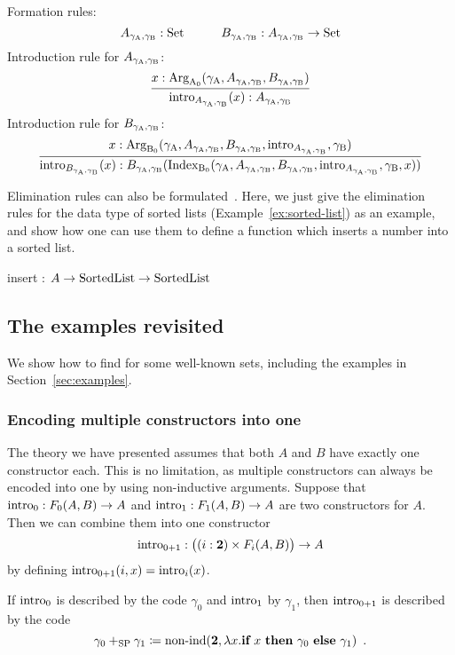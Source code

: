 \documentclass{article}
\begin{document}
Formation rules:
%
\[
A_{\gamma_{\mathrm{A}}, \gamma_{\mathrm{B}}} : \text{Set} \qquad\quad
B_{\gamma_{\mathrm{A}}, \gamma_{\mathrm{B}}} : A_{\gamma_{\mathrm{A}}, \gamma_{\mathrm{B}}} \to \text{Set}
\]
%
Introduction rule for $A_{\gamma_{\mathrm{A}}, \gamma_{\mathrm{B}}}$:
%
\[ %
\infer{\intro{A_{\gammaAB}}(x) : A_{\gammaAB}}{x : \ArgAp(\gammaA, A_{\gammaAB}, B_{\gammaAB})}
\]
%
Introduction rule for $B_{\gamma_{\mathrm{A}}, \gamma_{\mathrm{B}}}$:
%
\[
\infer{\intro{B_{\gammaAB}}(x) : B_{\gammaAB}(\IndexBp(\gammaA, A_{\gammaAB}, B_{\gammaAB}, \intro{A_{\gammaAB}}, \gammaB, x))}{x : \ArgBp(\gammaA, A_{\gammaAB}, B_{\gammaAB}, \intro{A_{\gammaAB}}, \gammaB)}
\]
%

Elimination rules can also be
formulated~\cite{nordvallforsbergAltenkirchMorrisSetzer2011catsemindind}. Here,
we just give the elimination rules for the data type of sorted lists
(Example~\ref{ex:sorted-list}) as an example, and show how one can use them to
define a function which inserts a number into a sorted list.

\begin{example}
 insert : $A \to \text{SortedList} \to \text{SortedList}$ %
\blackqed
\end{example}

\subsection{The examples revisited}
\label{sec:examples-revisited}

We show how to find \gammaAB{} for some well-known sets, including the
examples in Section~\ref{sec:examples}.

\subsubsection{Encoding multiple constructors into one}
\label{sec:comb-constructors}

The theory we have presented assumes that both $A$ and $B$ have
exactly one constructor each. This is no limitation, as multiple
constructors can always be encoded into one by using non-inductive
arguments. Suppose that $\text{intro}_{0} : F_0(A, B) \to A$ and $\text{intro}_{1} :
F_1(A, B) \to A$ are two constructors for $A$. Then we can combine
them into one constructor
\[
\text{intro}_{0 + 1} : \big((i : \mathbf{2}) \times F_i(A, B)\big) \to A
\]
by defining $\text{intro}_{0 +1}(i, x) = \text{intro}_{i}(x)$.

If $\text{intro}_{0}$ is described by the code $\gamma_0$ and $\text{intro}_{1}$ by
$\gamma_1$, then $\text{intro}_{0 + 1}$ is described by the code
\[
\gamma_0 +_{\text{SP}} \gamma_1 \coloneqq
\text{non-ind}(\mathbf{2}, \lambda x.\textbf{if}~x~\textbf{then}~\gamma_0~\textbf{else}~\gamma_1) \enspace .
\]
\end{document}
